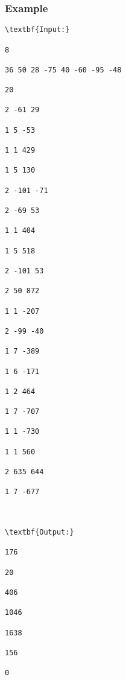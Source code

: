 \subsubsection{Example}
\begin{verbatim}
\textbf{Input:}

8

36 50 28 -75 40 -60 -95 -48

20

2 -61 29

1 5 -53

1 1 429

1 5 130

2 -101 -71

2 -69 53

1 1 404

1 5 518

2 -101 53

2 50 872

1 1 -207

2 -99 -40

1 7 -389

1 6 -171

1 2 464

1 7 -707

1 1 -730

1 1 560

2 635 644

1 7 -677



\textbf{Output:}

176

20

406

1046

1638

156

0

\end{verbatim}
